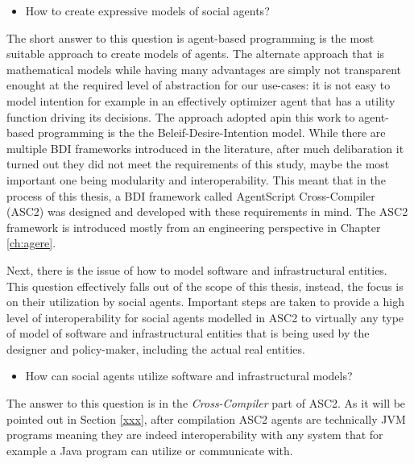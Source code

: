 \begin{itemize}
    \item How to create expressive models of social agents?
\end{itemize}

The short answer to this question is agent-based programming is the most suitable approach to create models of agents. The alternate approach that is mathematical models while having many advantages are simply not transparent enought at the required level of abstraction for our use-cases: it is not easy to model intention for example in an effectively optimizer agent that has a utility function driving its decisions. The approach adopted apin this work to agent-based programming is the the Beleif-Desire-Intention model. While there are multiple BDI frameworks introduced in the literature, after much delibaration it turned out they did not meet the requirements of this study, maybe the most important one being modularity and interoperability. This meant that in the process of this thesis, a BDI framework called AgentScript Cross-Compiler (ASC2) was designed and developed with these requirements in mind. The ASC2 framework is introduced mostly from an engineering perspective in Chapter \ref{ch:agere}. 

Next, there is the issue of how to model software and infrastructural entities. This question effectively falls out of the scope of this thesis, instead, the focus is on their utilization by social agents. Important steps are taken to provide a high level of interoperability for social agents modelled in ASC2 to virtually any type of model of software and infrastructural entities that is being used by the designer and policy-maker, including the actual real entities.

\begin{itemize}
    \item How can social agents utilize software and infrastructural models?
\end{itemize}

The answer to this question is in the \textit{Cross-Compiler} part of ASC2. As it will be pointed out in Section \ref{xxx}, after compilation ASC2 agents are technically JVM programs meaning they are indeed interoperability with any system that for example a Java program can utilize or communicate with. 




